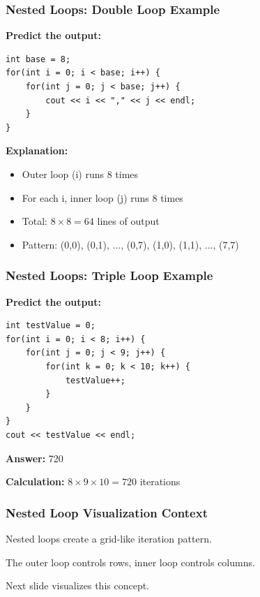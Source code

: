 \documentclass{beamer}
\begin{document}
\begin{frame}[fragile]
\frametitle{Nested Loops: Double Loop Example}
\textbf{Predict the output:}
\begin{verbatim}
int base = 8;
for(int i = 0; i < base; i++) {
    for(int j = 0; j < base; j++) {
        cout << i << "," << j << endl;
    }
}
\end{verbatim}
\pause

\textbf{Explanation:}
\begin{itemize}
\item Outer loop (i) runs 8 times
\item For each i, inner loop (j) runs 8 times
\item Total: $8 \times 8 = 64$ lines of output
\item Pattern: (0,0), (0,1), ..., (0,7), (1,0), (1,1), ..., (7,7)
\end{itemize}
\end{frame}

\begin{frame}[fragile]
\frametitle{Nested Loops: Triple Loop Example}
\textbf{Predict the output:}
\begin{verbatim}
int testValue = 0;
for(int i = 0; i < 8; i++) {
    for(int j = 0; j < 9; j++) {
        for(int k = 0; k < 10; k++) {
            testValue++;
        }
    }
}
cout << testValue << endl;
\end{verbatim}
\pause

\textbf{Answer:} 720\pause

\textbf{Calculation:} $8 \times 9 \times 10 = 720$ iterations
\end{frame}

\begin{frame}
\frametitle{Nested Loop Visualization Context}
Nested loops create a grid-like iteration pattern.\pause

The outer loop controls rows, inner loop controls columns.\pause

Next slide visualizes this concept.
\end{frame}
\end{document}
